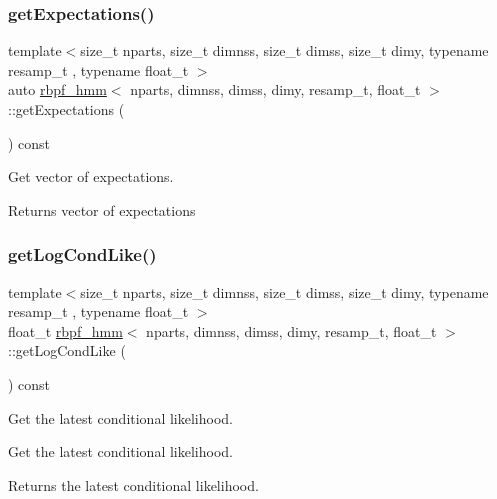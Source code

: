 \subsubsection{\texorpdfstring{get\+Expectations()}{getExpectations()}}
{\footnotesize\ttfamily template$<$size\+\_\+t nparts, size\+\_\+t dimnss, size\+\_\+t dimss, size\+\_\+t dimy, typename resamp\+\_\+t , typename float\+\_\+t $>$ \\
auto \hyperlink{classrbpf__hmm}{rbpf\+\_\+hmm}$<$ nparts, dimnss, dimss, dimy, resamp\+\_\+t, float\+\_\+t $>$\+::get\+Expectations (\begin{DoxyParamCaption}{ }\end{DoxyParamCaption}) const}



Get vector of expectations. 

\begin{DoxyReturn}{Returns}
vector of expectations 
\end{DoxyReturn}
\mbox{\label{classrbpf__hmm_ae0f486583c4c07f9bc97dd6288119889}} 
\subsubsection{\texorpdfstring{get\+Log\+Cond\+Like()}{getLogCondLike()}}
{\footnotesize\ttfamily template$<$size\+\_\+t nparts, size\+\_\+t dimnss, size\+\_\+t dimss, size\+\_\+t dimy, typename resamp\+\_\+t , typename float\+\_\+t $>$ \\
float\+\_\+t \hyperlink{classrbpf__hmm}{rbpf\+\_\+hmm}$<$ nparts, dimnss, dimss, dimy, resamp\+\_\+t, float\+\_\+t $>$\+::get\+Log\+Cond\+Like (\begin{DoxyParamCaption}{ }\end{DoxyParamCaption}) const}



Get the latest conditional likelihood. 

Get the latest conditional likelihood. \begin{DoxyReturn}{Returns}
the latest conditional likelihood. 
\end{DoxyReturn}
\mbox{\label{classrbpf__hmm_a3944acc8066774eaa0ff4330301447a1}} 
